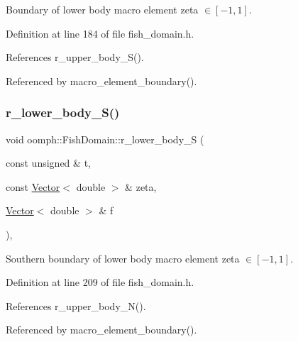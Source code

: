 Boundary of lower body macro element zeta $ \in [-1,1] $. 



Definition at line 184 of file fish\+\_\+domain.\+h.



References r\+\_\+upper\+\_\+body\+\_\+\+S().



Referenced by macro\+\_\+element\+\_\+boundary().

\mbox{\label{classoomph_1_1FishDomain_aa33b19ceef5cd574ee0a6756bcfc6da7}} 
\subsubsection{\texorpdfstring{r\+\_\+lower\+\_\+body\+\_\+\+S()}{r\_lower\_body\_S()}}
{\footnotesize\ttfamily void oomph\+::\+Fish\+Domain\+::r\+\_\+lower\+\_\+body\+\_\+S (\begin{DoxyParamCaption}\item[{const unsigned \&}]{t,  }\item[{const \hyperlink{classoomph_1_1Vector}{Vector}$<$ double $>$ \&}]{zeta,  }\item[{\hyperlink{classoomph_1_1Vector}{Vector}$<$ double $>$ \&}]{f }\end{DoxyParamCaption})\hspace{0.3cm}{\ttfamily [inline]}, {\ttfamily [private]}}



Southern boundary of lower body macro element zeta $\in [-1,1] $. 



Definition at line 209 of file fish\+\_\+domain.\+h.



References r\+\_\+upper\+\_\+body\+\_\+\+N().



Referenced by macro\+\_\+element\+\_\+boundary().

\mbox{\label{classoomph_1_1FishDomain_a4466e68eb38c1e931743db93af2e9ba9}} 
